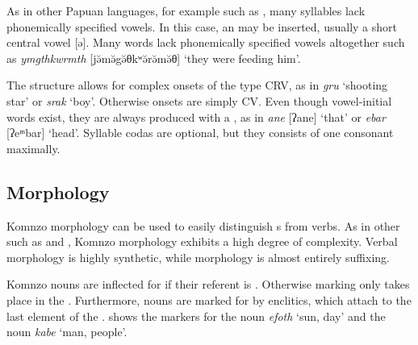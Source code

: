 As in other Papuan languages, for example such as  \citep{Blevins:2010ee}, many syllables lack phonemically specified vowels. In this case, an  may be inserted, usually a short central vowel [ə]. Many words lack phonemically specified vowels altogether such as \emph{ymgthkwrmth} [jə̆mə̆{\ᵑ}gə̆θkʷə̆rə̆mə̆θ] `they were feeding him'.

The  structure allows for complex onsets of the type CRV, as in \emph{gru} `shooting star' or \emph{srak} `boy'. Otherwise onsets are simply CV. Even though vowel-initial words exist, they are always produced with a , as in \emph{ane} [ʔane] `that' or \emph{ebar} [ʔeᵐbar] `head'. Syllable codas are optional, but they consists of one consonant maximally.

\subsection{Morphology}

Komnzo morphology can be used to easily distinguish s from verbs. As in other  such as  \citep{Siegel:2015bp} and  \citep{Evans:2015to}, Komnzo  morphology exhibits a high degree of complexity. Verbal morphology is highly synthetic, while  morphology is almost entirely suffixing.

Komnzo nouns are inflected for  if their referent is . Otherwise  marking only takes place in the . Furthermore, nouns are marked for  by enclitics, which attach to the last element of the .  shows the  markers for the  noun \emph{efoth} `sun, day' and the  noun \emph{kabe} `man, people'.

